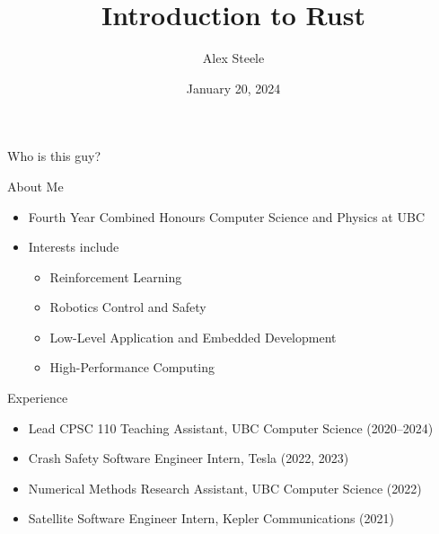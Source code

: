 \documentclass[8pt, aspectratio=169]{beamer}
\title{Introduction to Rust}
\author{Alex Steele}
\date{January 20, 2024}
\institute[UBC]{University of British Columbia}
\begin{document}
\maketitle

\begin{frame}{Who is this guy?}
\begin{block}{About Me}
\begin{itemize}
\item Fourth Year Combined Honours Computer Science and Physics at UBC
\item Interests include
\begin{itemize}
\item Reinforcement Learning
\item Robotics Control and Safety
\item Low-Level Application and Embedded Development
\item High-Performance Computing
\end{itemize}
\end{itemize}
\end{block}
\begin{block}{Experience}
\begin{itemize}
\item Lead CPSC 110 Teaching Assistant, UBC Computer Science (2020--2024)
\item Crash Safety Software Engineer Intern, Tesla (2022, 2023)
\item Numerical Methods Research Assistant, UBC Computer Science (2022)
\item Satellite Software Engineer Intern, Kepler Communications (2021)
\end{itemize}
\end{block}
\end{frame}
\end{document}
